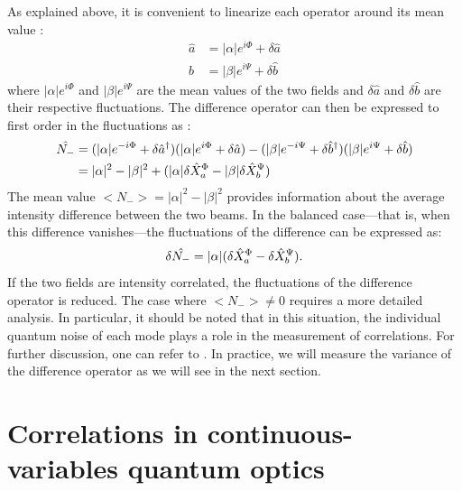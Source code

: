 As explained above, it is convenient to linearize each operator around its mean value :
\begin{equation}
    \begin{aligned}
    \hat{a} &= |\alpha|e^{i\Phi} + \delta \hat{a} \\
    \hat{b} &= |\beta|e^{i\Psi} + \delta \hat{b}
    \end{aligned}
\end{equation}
where $|\alpha|e^{i\Phi}$ and $|\beta|e^{i\Psi}$ are the mean values of the two fields and $\delta \hat{a}$ and $\delta \hat{b}$ are their respective fluctuations.
The difference operator can then be expressed to first order in the fluctuations as :
\begin{equation}
    \label{eq:diff_op2}
    \begin{aligned}
    \hat{N_-} &= (|\alpha|e^{-i\Phi}+\delta \hat{a}^\dagger)(|\alpha|e^{i\Phi}+\delta \hat{a}) - (|\beta|e^{-i\Psi}+\delta \hat{b}^\dagger)(|\beta|e^{i\Psi}+\delta \hat{b}) \\
    &= |\alpha|^2 - |\beta|^2 +(|\alpha|\delta \hat{X}_a^\Phi - |\beta|\delta \hat{X}_b^\Psi) 
    \end{aligned}
\end{equation}
The mean value $<N_->=|\alpha|^2-|\beta|^2$ provides information about the average intensity difference between the two beams. In the balanced case—that is, when this difference vanishes—the fluctuations of the difference can be expressed as:
\begin{equation}
    \label{eq:diff_fluctuation}
    \delta \hat{N_-} = |\alpha|(\delta \hat{X}_a^\Phi - \delta \hat{X}_b^\Psi).
\end{equation}
If the two fields are intensity correlated, the fluctuations of the difference operator is reduced. The case where $<N_->\neq0$ requires a more detailed analysis. In particular, it should be noted that in this situation, the individual quantum noise of each mode plays a role in the measurement of correlations. For further discussion, one can refer to \cite{treps_fabre_criteria_2004}. 
In practice, we will measure the variance of the difference operator as we will see in the next section.
\section{Correlations in continuous-variables quantum optics}

